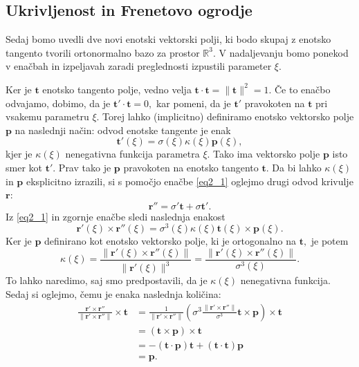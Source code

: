 \documentclass[12pt,a4paper,twoside]{article}
\theoremstyle{definition} %
\theoremstyle{plain} %
\numberwithin{equation}{section}  %
\newcommand{\R}{\mathbb R}
\begin{document}
\subsection{Ukrivljenost in Frenetovo ogrodje}

Sedaj bomo uvedli dve novi enotski vektorski polji, ki bodo skupaj z enotsko tangento tvorili ortonormalno bazo za prostor $\R^3.$ V nadaljevanju bomo ponekod v enačbah in izpeljavah zaradi preglednosti izpustili parameter $\xi.$

Ker je $\mathbf{t}$ enotsko tangento polje, vedno velja $\mathbf{t} \cdot \mathbf{t}=\lVert \mathbf{t} \rVert^2 =1.$ Če to enačbo odvajamo, dobimo, da je $\mathbf{t'} \cdot \mathbf{t}=0,$ kar pomeni, da je $\mathbf{t'}$ pravokoten na $\mathbf{t}$ pri vsakemu parametru $\xi.$ Torej lahko (implicitno) definiramo enotsko vektorsko polje $\mathbf{p}$ na naslednji način: odvod enotske tangente je enak
\begin{equation}
	\label{eq2_5}
	\mathbf{t'}(\xi)=\sigma(\xi)\kappa(\xi)\mathbf{p}(\xi),
\end{equation}
kjer je $\kappa(\xi)$ nenegativna funkcija parametra $\xi.$ Tako ima vektorsko polje $\mathbf{p}$ isto smer kot $\mathbf{t'}.$ Prav tako je $\mathbf{p}$ pravokoten na enotsko tangento $\mathbf{t}.$ Da bi lahko $\kappa(\xi)$ in $\mathbf{p}$ eksplicitno izrazili, si s pomočjo enačbe \eqref{eq2_1} oglejmo drugi odvod krivulje $\mathbf{r}:$
\begin{equation}
	\label{eq2_6}
	\mathbf{r''}=\sigma'\mathbf{t}+\sigma\mathbf{t'}.
\end{equation}
Iz \eqref{eq2_1} in zgornje enačbe sledi naslednja enakost
\begin{equation}
	\label{eq2_7}
	\mathbf{r'}(\xi) \times \mathbf{r''}(\xi)=\sigma^3(\xi)\kappa(\xi)\mathbf{t}(\xi) \times \mathbf{p}(\xi).
\end{equation}
Ker je $\mathbf{p}$ definirano kot enotsko vektorsko polje, ki je ortogonalno na $\mathbf{t},$ je potem
\begin{equation}
	\label{kappa1}
	\kappa(\xi)=\frac{\lVert \mathbf{r'}(\xi) \times \mathbf{r''}(\xi) \rVert}{\lVert \mathbf{r'}(\xi) \rVert^3}=\frac{\lVert \mathbf{r'}(\xi) \times \mathbf{r''}(\xi) \rVert}{\sigma^3(\xi)}.
\end{equation}
To lahko naredimo, saj smo predpostavili, da je $\kappa(\xi)$ nenegativna funkcija. Sedaj si oglejmo, čemu je enaka naslednja količina:
\begin{align}
	\frac{\mathbf{r'}\times \mathbf{r''}}{\lVert \mathbf{r'}\times \mathbf{r''} \rVert} \times \mathbf{t} &= \frac{1}{\lVert \mathbf{r'}\times \mathbf{r''} \rVert} \left ( \sigma^3 \frac{\lVert \mathbf{r'}\times \mathbf{r''} \rVert}{\sigma^3}\mathbf{t} \times \mathbf{p}\right ) \times \mathbf{t} \nonumber \\
	&= (\mathbf{t} \times \mathbf{p}) \times \mathbf{t} \nonumber \\
	&= -(\mathbf{t} \cdot \mathbf{p})\mathbf{t} + (\mathbf{t} \cdot \mathbf{t})\mathbf{p} \nonumber \\
	&= \mathbf{p}. \label{normala}
\end{align}
\end{document}
